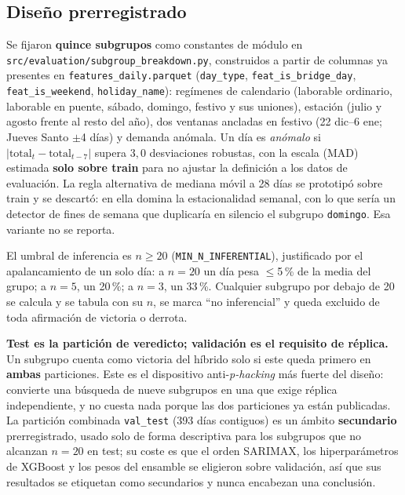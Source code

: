 \subsection{Diseño prerregistrado}\label{sec:desglose_diseno}

Se fijaron \textbf{quince subgrupos} como constantes de módulo en
\texttt{src/\allowbreak{}evaluation/\allowbreak{}subgroup\_breakdown.py}, construidos a partir de columnas ya
presentes en \texttt{features\_daily.parquet} (\texttt{day\_type}, \texttt{feat\_is\_bridge\_day},
\texttt{feat\_is\_weekend}, \texttt{holiday\_name}): regímenes de calendario (laborable
ordinario, laborable en puente, sábado, domingo, festivo y sus uniones), estación (julio y
agosto frente al resto del año), dos ventanas ancladas en festivo (22 dic--6 ene; Jueves
Santo $\pm$4 días) y demanda anómala. Un día es \emph{anómalo} si
$\lvert \text{total}_t - \text{total}_{t-7}\rvert$ supera $3{,}0$ desviaciones robustas,
con la escala (MAD) estimada \textbf{solo sobre train} para no ajustar la definición a los
datos de evaluación. La regla alternativa de mediana móvil a 28 días se prototipó sobre
train y se descartó: en ella domina la estacionalidad semanal, con lo que sería un
detector de fines de semana que duplicaría en silencio el subgrupo \texttt{domingo}. Esa
variante no se reporta.

El umbral de inferencia es $n \geq 20$ (\texttt{MIN\_N\_INFERENTIAL}), justificado por el
apalancamiento de un solo día: a $n=20$ un día pesa $\leq$5\,\% de la media del grupo; a
$n=5$, un 20\,\%; a $n=3$, un 33\,\%. Cualquier subgrupo por debajo de 20 se calcula y se
tabula con su $n$, se marca ``no inferencial'' y queda excluido de toda afirmación de
victoria o derrota.

\textbf{Test es la partición de veredicto; validación es el requisito de réplica.} Un
subgrupo cuenta como victoria del híbrido solo si este queda primero en \textbf{ambas}
particiones. Este es el dispositivo anti-\emph{p-hacking} más fuerte del diseño: convierte
una búsqueda de nueve subgrupos en una que exige réplica independiente, y no cuesta nada
porque las dos particiones ya están publicadas. La partición combinada \texttt{val\_test}
(393 días contiguos) es un ámbito \textbf{secundario} prerregistrado, usado solo de forma
descriptiva para los subgrupos que no alcanzan $n=20$ en test; su coste es que el orden
SARIMAX, los hiperparámetros de XGBoost y los pesos del ensamble se eligieron sobre
validación, así que sus resultados se etiquetan como secundarios y nunca encabezan una
conclusión.

